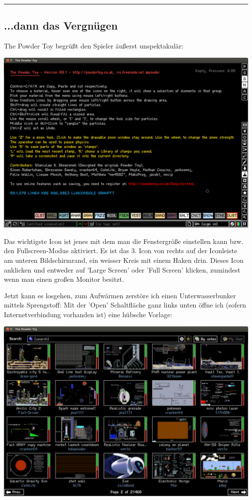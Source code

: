 \documentclass[10pt,a4paper,ngerman,twoside]{article} %
\newcommand{\SepRule}{\noindent	%
\begin{center}
\rule{250pt}{1pt} %
\end{center}
}
\begin{document}
\SepRule
\begin{multicols}{2}
\subsection*{...dann das Vergnügen}

The Powder Toy begrüßt den Spieler äußerst unspektakulär:
\begin{center}
\includegraphics[width=\linewidth]{powdertoy/powdertoy-intro.png}
\end{center}

Das wichtigste Icon ist jenes mit dem man die Fenstergröße einstellen kann bzw. den Fullscreen-Modus aktiviert. Es ist das 3. Icon von rechts auf der Iconleiste am unteren Bildschirmrand, ein weisser Kreis mit einem Haken drin. Dieses Icon anklicken und entweder auf 'Large Screen' oder 'Full Screen' klicken, zumindest wenn man einen großen Monitor besitzt. 

Jetzt kann es losgehen, zum Aufwärmen zerstöre ich einen Unterwasserbunker mittels Sprengstoff:
Mit der 'Open' Schaltfläche ganz links unten öffne ich (sofern Internetverbindung vorhanden ist) eine hübsche Vorlage:
\begin{center}
\includegraphics[width=\linewidth]{powdertoy/powdertoy-auswahl.png}
\end{center}


\end{multicols}
\end{document}
